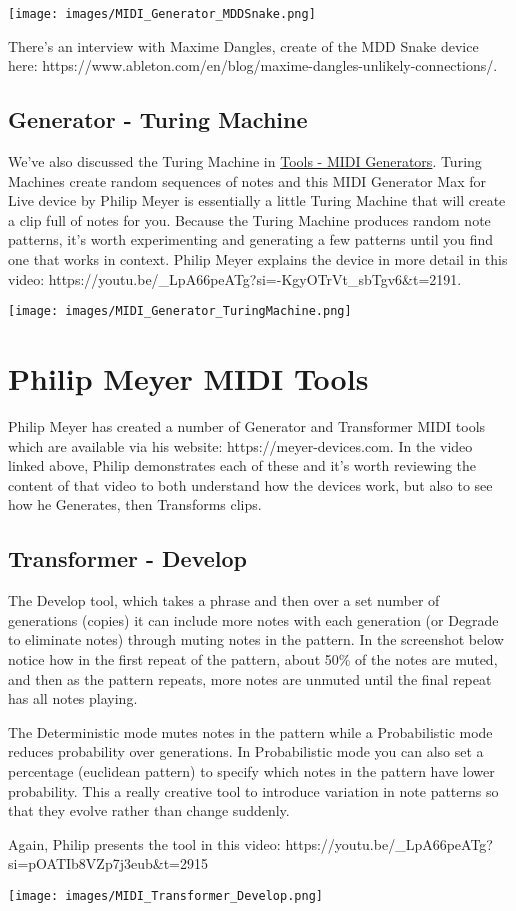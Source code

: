 \documentclass[
  12pt,
  letterpaper,
  oneside,
  open=any]{scrbook}
\begin{document}
\texttt{[image: images/MIDI\_Generator\_MDDSnake.png]}

There's an interview with Maxime Dangles, create of the MDD Snake device
here:
https://www.ableton.com/en/blog/maxime-dangles-unlikely-connections/.

\subsection{Generator - Turing
Machine}\label{generator---turing-machine}

We've also discussed the Turing Machine in
\hyperref[Chapter-012-Tools-MIDI_Generators]{Tools - MIDI Generators}.
Turing Machines create random sequences of notes and this MIDI Generator
Max for Live device by Philip Meyer is essentially a little Turing
Machine that will create a clip full of notes for you. Because the
Turing Machine produces random note patterns, it's worth experimenting
and generating a few patterns until you find one that works in context.
Philip Meyer explains the device in more detail in this video:
https://youtu.be/\_LpA66peATg?si=-KgyOTrVt\_sbTgv6\&t=2191.

\texttt{[image: images/MIDI\_Generator\_TuringMachine.png]}

\section{Philip Meyer MIDI Tools}\label{philip-meyer-midi-tools}

Philip Meyer has created a number of Generator and Transformer MIDI
tools which are available via his website: https://meyer-devices.com. In
the video linked above, Philip demonstrates each of these and it's worth
reviewing the content of that video to both understand how the devices
work, but also to see how he Generates, then Transforms clips.

\subsection{Transformer - Develop}\label{transformer---develop}

The Develop tool, which takes a phrase and then over a set number of
generations (copies) it can include more notes with each generation (or
Degrade to eliminate notes) through muting notes in the pattern. In the
screenshot below notice how in the first repeat of the pattern, about
50\% of the notes are muted, and then as the pattern repeats, more notes
are unmuted until the final repeat has all notes playing.

The Deterministic mode mutes notes in the pattern while a Probabilistic
mode reduces probability over generations. In Probabilistic mode you can
also set a percentage (euclidean pattern) to specify which notes in the
pattern have lower probability. This a really creative tool to introduce
variation in note patterns so that they evolve rather than change
suddenly.

Again, Philip presents the tool in this video:
https://youtu.be/\_LpA66peATg?si=pOATIb8VZp7j3eub\&t=2915

\texttt{[image: images/MIDI\_Transformer\_Develop.png]}


\backmatter
\end{document}
